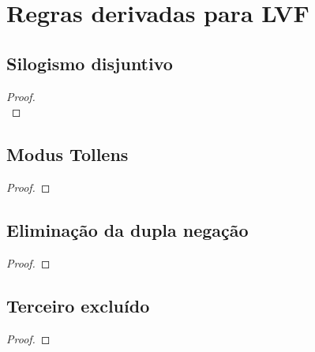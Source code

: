 \newpage
\section{Regras derivadas para LVF}
\begin{multicols}{2}
\subsection*{Silogismo disjuntivo}
\begin{proof}

\\	
\end{proof}

\subsection*{Modus Tollens}

\begin{proof}
	 
\end{proof}

\subsection*{Eliminação da dupla negação}
	\begin{proof}
	\end{proof}


\subsection*{Terceiro excluído}
	\begin{proof}
		\open
		\close
		\open
		\close
	\end{proof}

%
%


\end{multicols}
